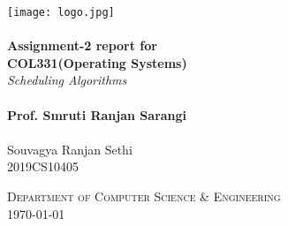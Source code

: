 \documentclass{article}
\begin{document}
\begin{titlepage}
    \begin{center}
        \texttt{[image: logo.jpg]}~\\[1.6cm]
    
        \HRule \\[0.4cm]
        { \LARGE 
          \textbf{Assignment-2 report for \\ COL331(Operating Systems)}\\[0.4cm]
          \emph{Scheduling Algorithms}\\[0.4cm]
        }
        \HRule \\[1.5cm]
        
        
        { \large
            \textbf{Prof. Smruti Ranjan Sarangi}\\ \\[0.1cm]
            \vspace{20pt}
            Souvagya Ranjan Sethi \\2019CS10405
        }
        
        \vfill
        
        \textsc{\large Department of Computer Science \& Engineering}\\[0.4cm]
        {\large \today}
         
    \end{center}
\end{titlepage}
\end{document}
